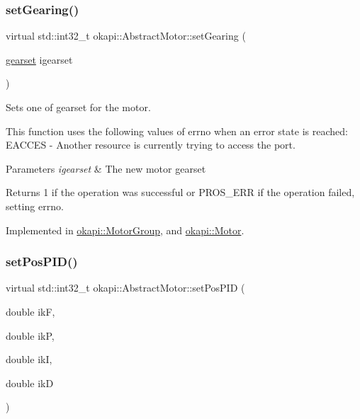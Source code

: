 \subsubsection{\texorpdfstring{setGearing()}{setGearing()}}
{\footnotesize\ttfamily virtual std\+::int32\+\_\+t okapi\+::\+Abstract\+Motor\+::set\+Gearing (\begin{DoxyParamCaption}\item[{\mbox{\hyperlink{classokapi_1_1AbstractMotor_a88aaa6ea2fa10f5520a537bbf26774d5}{gearset}}}]{igearset }\end{DoxyParamCaption})\hspace{0.3cm}{\ttfamily [pure virtual]}}

Sets one of gearset for the motor.

This function uses the following values of errno when an error state is reached\+: E\+A\+C\+C\+ES -\/ Another resource is currently trying to access the port.


\begin{DoxyParams}{Parameters}
{\em igearset} & The new motor gearset \\
\hline
\end{DoxyParams}
\begin{DoxyReturn}{Returns}
1 if the operation was successful or P\+R\+O\+S\+\_\+\+E\+RR if the operation failed, setting errno. 
\end{DoxyReturn}


Implemented in \mbox{\hyperlink{classokapi_1_1MotorGroup_a5720f3775594f0097856754776526a47}{okapi\+::\+Motor\+Group}}, and \mbox{\hyperlink{classokapi_1_1Motor_a670cb230fe9686ce8fa71ee20607eb12}{okapi\+::\+Motor}}.

\mbox{\label{classokapi_1_1AbstractMotor_ad979f7591071947ab3aec693f3c73c03}} 
\subsubsection{\texorpdfstring{setPosPID()}{setPosPID()}}
{\footnotesize\ttfamily virtual std\+::int32\+\_\+t okapi\+::\+Abstract\+Motor\+::set\+Pos\+P\+ID (\begin{DoxyParamCaption}\item[{double}]{ikF,  }\item[{double}]{ikP,  }\item[{double}]{ikI,  }\item[{double}]{ikD }\end{DoxyParamCaption})\hspace{0.3cm}{\ttfamily [pure virtual]}}

